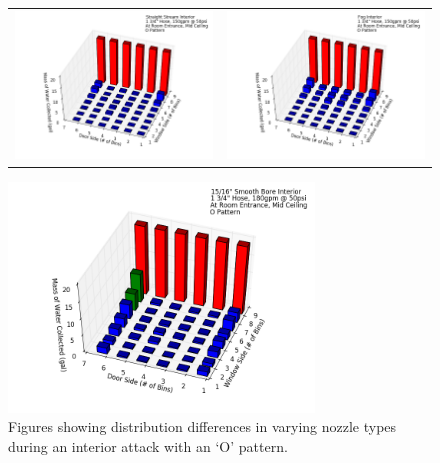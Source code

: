 \documentclass{article}
\begin{document}
\clearpage


\begin{figure}[ht]
\begin{tabular*}{\textwidth}{lr}
\includegraphics[width=3.2in]{../ADD_Analysis/Figures/15-12-09_122551_Datafile_Straight_Stream_Interior.png} &
\includegraphics[width=3.2in]{../ADD_Analysis/Figures/15-12-09_123636_Datafile_Fog_Interior.png} \\
\end{tabular*}
\centering
\includegraphics[width=3.2in]{../ADD_Analysis/Figures/15-12-09_145534_Datafile_15_16in_Smooth_Bore_Interior.png}
\caption{Figures showing distribution differences in varying nozzle types during an interior attack with an `O' pattern.}
\label{fig:Interior_Varying_Nozzle_Types_O_Pattern}
\end{figure}
\end{document}
